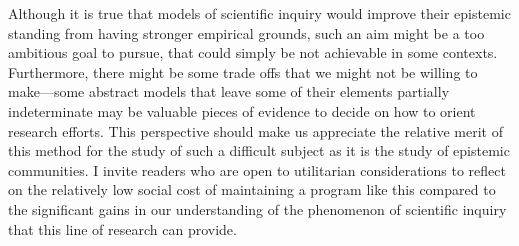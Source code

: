 \documentclass{article}
\begin{document}
Although it is true that models of scientific inquiry would improve their epistemic standing from having stronger empirical grounds, such an aim might be a too ambitious goal to pursue, that could simply be not achievable in some contexts. Furthermore, there might be some trade offs that we might not be willing to make—some abstract models that leave some of their elements partially indeterminate may be valuable pieces of evidence to decide on how to orient research efforts. This perspective should make us appreciate the relative merit of this method for the study of such a difficult subject as it is the study of epistemic communities. I invite readers who are open to utilitarian considerations to reflect on the relatively low social cost of maintaining a program like this compared to the significant gains in our understanding of the phenomenon of scientific inquiry that this line of research can provide.





\end{document}
